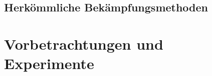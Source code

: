 \documentclass[11pt,a4paper]{article}
\begin{document}
\subsection{Herkömmliche Bekämpfungsmethoden}



\newpage
\section{Vorbetrachtungen und Experimente} \label{section:Vorbetrachtungen}

\end{document}

